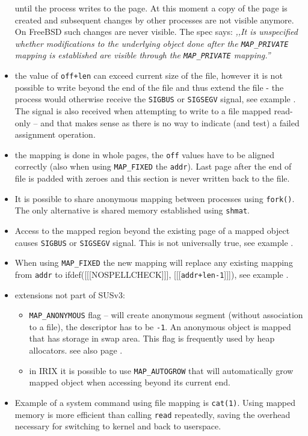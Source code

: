 \begin{itemize}
until the process writes to the page. At this moment a copy of the page is
created and subsequent changes by other processes are not visible anymore.
On FreeBSD such changes are never visible.  The spec says:
\emph{,,It is unspecified whether modifications to the underlying object done
after the \texttt{MAP\_PRIVATE} mapping is established are visible through the
\texttt{MAP\_PRIVATE} mapping.''}
\item the value of \texttt{off+l{}en} can exceed current size of the file,
however it is not possible to write beyond the end of the file and thus
extend the file - the process would otherwise receive the \texttt{SIGBUS} or
\texttt{SIGSEGV} signal, see example .
The signal is also received when attempting to write to a file mapped read-only
-- and that makes sense as there is no way to indicate (and test) a failed
assignment operation.
\item the mapping is done in whole pages, the \texttt{off} values have to
be aligned correctly (also when using \texttt{MAP\_FIXED} the \texttt{addr}).
Last page after the end of file is padded with zeroes and this section is
never written back to the file.
\item It is possible to share anonymous mapping between processes using
\texttt{fork()}. The only alternative is shared memory established using
\texttt{shmat}.
\item Access to the mapped region beyond the existing page of a mapped object
causes \texttt{SIGBUS} or \texttt{SIGSEGV} signal.
This is not universally true, see example .
\item When using \texttt{MAP\_FIXED} the new mapping will replace any existing
mapping from \texttt{addr} to
ifdef([[[NOSPELLCHECK]]], [[[\texttt{addr+l{}en-1}]]]), see example
.
\item extensions not part of SUSv3:
    \begin{itemize}
    \setlength{\itemsep}{0.8\itemsep}
    \item \texttt{MAP\_ANONYMOUS} flag -- will create anonymous segment
    (without association to a file), the descriptor has to be \texttt{-1}.
    An anonymous object is mapped that has storage in swap area.
    This flag is frequently used by heap allocators.
    see also page \pageref{SOLARIS_PROC_ADDR_SPACE}.
    \item in IRIX it is possible to use \texttt{MAP\_AUTOGROW} that will
    automatically grow mapped object when accessing beyond its current end.
    \end{itemize}
\item Example of a system command using file mapping is \texttt{cat(1)}.  Using
mapped memory is more efficient than calling \texttt{read} repeatedly, saving
the overhead necessary for switching to kernel and back to userspace.
\end{itemize}

